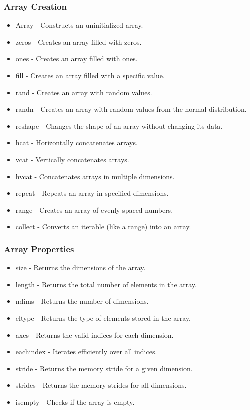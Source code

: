 \documentclass{report}
\begin{document}
    \subsubsection{ Array Creation}
    \begin{itemize}
        \item Array - Constructs an uninitialized array.
        \item zeros - Creates an array filled with zeros.
        \item ones - Creates an array filled with ones.
        \item fill - Creates an array filled with a specific value.
        \item rand - Creates an array with random values.
        \item randn - Creates an array with random values from the normal distribution.
        \item reshape - Changes the shape of an array without changing its data.
        \item hcat - Horizontally concatenates arrays.
        \item vcat - Vertically concatenates arrays.
        \item hvcat - Concatenates arrays in multiple dimensions.
        \item repeat - Repeats an array in specified dimensions.
        \item range - Creates an array of evenly spaced numbers.
        \item collect - Converts an iterable (like a range) into an array.
    \end{itemize}

    \bigbreak \noindent 
    \subsubsection{Array Properties}
\begin{itemize}
        \item size - Returns the dimensions of the array.
        \item length - Returns the total number of elements in the array.
        \item ndims - Returns the number of dimensions.
        \item eltype - Returns the type of elements stored in the array.
        \item axes - Returns the valid indices for each dimension.
        \item eachindex - Iterates efficiently over all indices.
        \item stride - Returns the memory stride for a given dimension.
        \item strides - Returns the memory strides for all dimensions.
        \item isempty - Checks if the array is empty.
    \end{itemize}
\end{document}
